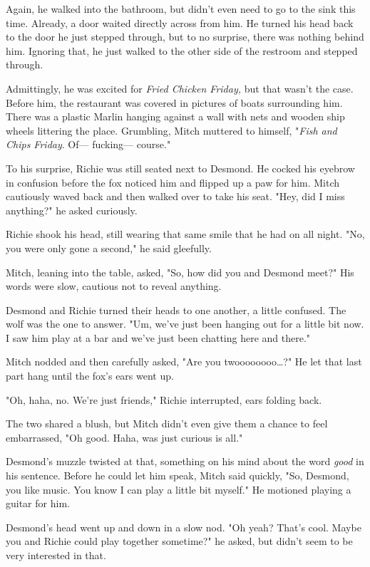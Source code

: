 Again, he walked into the bathroom, but didn't even need to go to the sink this time. Already, a door waited directly across from him. He turned his head back to the door he just stepped through, but to no surprise, there was nothing behind him. Ignoring that, he just walked to the other side of the restroom and stepped through.

Admittingly, he was excited for \emph{Fried Chicken Friday,} but that wasn't the case. Before him, the restaurant was covered in pictures of boats surrounding him. There was a plastic Marlin hanging against a wall with nets and wooden ship wheels littering the place. Grumbling, Mitch muttered to himself, "\emph{Fish and Chips Friday}. Of--- fucking--- course."

To his surprise, Richie was still seated next to Desmond. He cocked his eyebrow in confusion before the fox noticed him and flipped up a paw for him. Mitch cautiously waved back and then walked over to take his seat. "Hey, did I miss anything?" he asked curiously.

Richie shook his head, still wearing that same smile that he had on all night. "No, you were only gone a second," he said gleefully.

Mitch, leaning into the table, asked, "So, how did you and Desmond meet?" His words were slow, cautious not to reveal anything.

Desmond and Richie turned their heads to one another, a little confused. The wolf was the one to answer. "Um, we've just been hanging out for a little bit now. I saw him play at a bar and we've just been chatting here and there."

Mitch nodded and then carefully asked, "Are you twoooooooo\ldots?" He let that last part hang until the fox's ears went up.

"Oh, haha, no. We're just friends," Richie interrupted, ears folding back.

The two shared a blush, but Mitch didn't even give them a chance to feel embarrassed, "Oh good. Haha, was just curious is all."

Desmond's muzzle twisted at that, something on his mind about the word \emph{good} in his sentence. Before he could let him speak, Mitch said quickly, "So, Desmond, you like music. You know I can play a little bit myself." He motioned playing a guitar for him.

Desmond's head went up and down in a slow nod. "Oh yeah? That's cool. Maybe you and Richie could play together sometime?" he asked, but didn't seem to be very interested in that.

